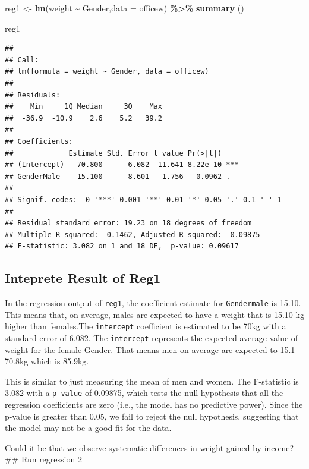 \documentclass[
]{article}
\newenvironment{Shaded}{\begin{snugshade}}{\end{snugshade}}
\newcommand{\AttributeTok}[1]{\textcolor[rgb]{0.13,0.29,0.53}{#1}}
\newcommand{\FunctionTok}[1]{\textcolor[rgb]{0.13,0.29,0.53}{\textbf{#1}}}
\newcommand{\NormalTok}[1]{#1}
\newcommand{\OtherTok}[1]{\textcolor[rgb]{0.56,0.35,0.01}{#1}}
\newcommand{\SpecialCharTok}[1]{\textcolor[rgb]{0.81,0.36,0.00}{\textbf{#1}}}
\begin{document}
\begin{Shaded}
\begin{Highlighting}[]
\NormalTok{reg1 }\OtherTok{\textless{}{-}} \FunctionTok{lm}\NormalTok{(weight }\SpecialCharTok{\textasciitilde{}}\NormalTok{ Gender,}\AttributeTok{data =}\NormalTok{ officew) }\SpecialCharTok{\%\textgreater{}\%} 
\FunctionTok{summary}\NormalTok{ ()}

\NormalTok{reg1 }
\end{Highlighting}
\end{Shaded}

\begin{verbatim}
## 
## Call:
## lm(formula = weight ~ Gender, data = officew)
## 
## Residuals:
##    Min     1Q Median     3Q    Max 
##  -36.9  -10.9    2.6    5.2   39.2 
## 
## Coefficients:
##             Estimate Std. Error t value Pr(>|t|)    
## (Intercept)   70.800      6.082  11.641 8.22e-10 ***
## GenderMale    15.100      8.601   1.756   0.0962 .  
## ---
## Signif. codes:  0 '***' 0.001 '**' 0.01 '*' 0.05 '.' 0.1 ' ' 1
## 
## Residual standard error: 19.23 on 18 degrees of freedom
## Multiple R-squared:  0.1462, Adjusted R-squared:  0.09875 
## F-statistic: 3.082 on 1 and 18 DF,  p-value: 0.09617
\end{verbatim}

\hypertarget{inteprete-result-of-reg1}{%
\subsection{Inteprete Result of Reg1}\label{inteprete-result-of-reg1}}

In the regression output of \texttt{reg1}, the coefficient estimate for
\texttt{Gendermale} is 15.10. This means that, on average, males are
expected to have a weight that is 15.10 kg higher than females.The
\texttt{intercept} coefficient is estimated to be 70kg with a standard
error of 6.082. The \texttt{intercept} represents the expected average
value of weight for the female Gender. That means men on average are
expected to 15.1 + 70.8kg which is 85.9kg.

This is similar to just measuring the mean of men and women. The
F-statistic is 3.082 with a \texttt{p-value} of 0.09875, which tests the
null hypothesis that all the regression coefficients are zero (i.e., the
model has no predictive power). Since the p-value is greater than 0.05,
we fail to reject the null hypothesis, suggesting that the model may not
be a good fit for the data.

Could it be that we observe systematic differences in weight gained by
income? \#\# Run regression 2
\end{document}
